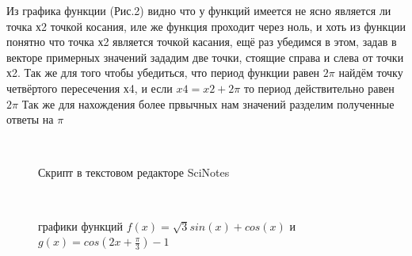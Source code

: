 \documentclass[russian,utf8,nocolumnxxxi,nocolumnxxxii]{eskdtext}
\begin{document}
Из графика функции (Рис.2) видно что у функций имеется не ясно является ли точка х2 точкой косания, иле же функция проходит через ноль, и хоть из функции понятно что точка х2 является точкой касания, ещё раз убедимся в этом, задав в векторе примерных значений зададим две точки, стоящие справа и слева от точки х2.
Так же для того чтобы убедиться, что период функции равен $2\pi$ найдём точку четвёртого пересечения х4, и если $x4=x2+2\pi$ то период действительно равен $2\pi$
Так же для нахождения более првычных нам значений разделим полученные ответы на $\pi$
\begin{figure}[H]
 \\
\caption{Скрипт в текстовом редакторе SciNotes}
\end{figure}

\begin{figure}[H]
 \\
\caption{графики функций $f(x)=\sqrt{3}sin(x)+cos(x)$ и $g(x)=cos(2x+\frac{\pi}{3})-1$}
\end{figure}
\end{document}
